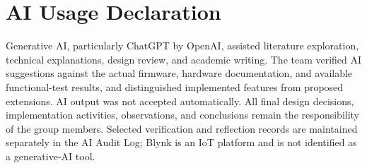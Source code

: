 \documentclass[12pt,a4paper]{article}
\begin{document}
\section*{AI Usage Declaration}
Generative AI, particularly ChatGPT by OpenAI, assisted literature exploration, technical explanations, design review, and academic writing. The team verified AI suggestions against the actual firmware, hardware documentation, and available functional-test results, and distinguished implemented features from proposed extensions. AI output was not accepted automatically. All final design decisions, implementation activities, observations, and conclusions remain the responsibility of the group members. Selected verification and reflection records are maintained separately in the AI Audit Log; Blynk is an IoT platform and is not identified as a generative-AI tool.
\end{document}
